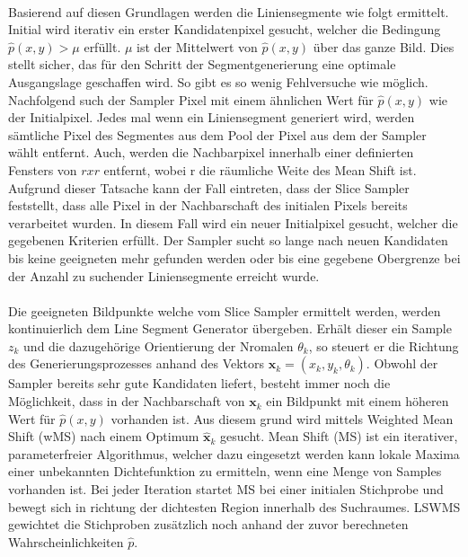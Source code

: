 \paragraph{}
Basierend auf diesen Grundlagen werden die Liniensegmente wie folgt ermittelt. Initial wird iterativ ein erster Kandidatenpixel gesucht, welcher die Bedingung $\hat{p}(x, y) > \mu$ erfüllt. $\mu$ ist der Mittelwert von $\hat{p}(x, y)$ über das ganze Bild. Dies stellt sicher, das für den Schritt der Segmentgenerierung eine optimale Ausgangslage geschaffen wird. So gibt es so wenig Fehlversuche wie möglich. Nachfolgend such der Sampler Pixel mit einem ähnlichen Wert für $\hat{p}(x, y)$ wie der Initialpixel. Jedes mal wenn ein Liniensegment generiert wird, werden sämtliche Pixel des Segmentes aus dem Pool der Pixel aus dem der Sampler wählt entfernt. Auch, werden die Nachbarpixel innerhalb einer definierten Fensters von $r x r$ entfernt, wobei r die räumliche Weite des Mean Shift ist. Aufgrund dieser Tatsache kann der Fall eintreten, dass der Slice Sampler feststellt, dass alle Pixel in der Nachbarschaft des initialen Pixels bereits verarbeitet wurden. In diesem Fall wird ein neuer Initialpixel gesucht, welcher die gegebenen Kriterien erfüllt. Der Sampler sucht so lange nach neuen Kandidaten bis keine geeigneten mehr gefunden werden oder bis eine gegebene Obergrenze bei der Anzahl zu suchender Liniensegmente erreicht wurde.
\paragraph{}
Die geeigneten Bildpunkte welche vom Slice Sampler ermittelt werden, werden kontinuierlich dem Line Segment Generator übergeben. Erhält dieser ein Sample $z_k$ und die dazugehörige Orientierung der Nromalen $\theta_k$, so steuert er die Richtung des Generierungsprozesses anhand des Vektors $\textbf{x}_{k} = (x_k, y_k, \theta_k)$. Obwohl der Sampler bereits sehr gute Kandidaten liefert, besteht immer noch die Möglichkeit, dass in der Nachbarschaft von $\textbf{x}_k$ ein Bildpunkt mit einem höheren Wert für $\hat{p}(x, y)$ vorhanden ist. Aus diesem grund wird mittels Weighted Mean Shift (wMS) nach einem Optimum $\hat{\textbf{x}}_k$ gesucht. Mean Shift (MS) ist ein iterativer, parameterfreier Algorithmus, welcher dazu eingesetzt werden kann lokale Maxima einer unbekannten Dichtefunktion zu ermitteln, wenn eine Menge von Samples vorhanden ist. Bei jeder Iteration startet MS bei einer initialen Stichprobe und bewegt sich in richtung der dichtesten Region innerhalb des Suchraumes. LSWMS gewichtet die Stichproben zusätzlich noch anhand der zuvor berechneten Wahrscheinlichkeiten $\hat{p}$.
